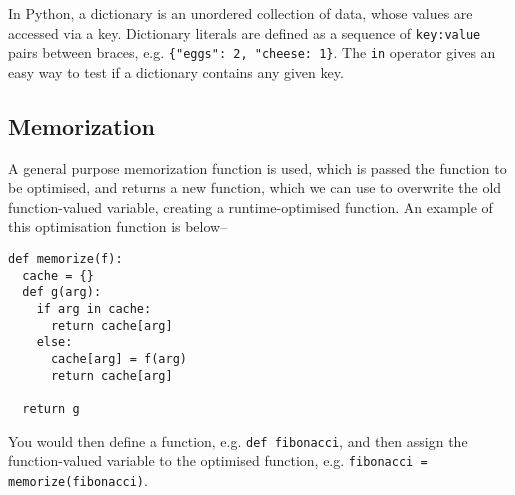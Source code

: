 In Python, a dictionary is an unordered collection of data, whose values are accessed via a key. Dictionary literals are
 defined as a sequence of \verb`key:value` pairs between braces, e.g. \verb`{"eggs": 2, "cheese: 1}`. The \verb`in`
 operator gives an easy way to test if a dictionary contains any given key.

\subsection*{Memorization}

A general purpose memorization function is used, which is passed the function to be optimised, and returns a new
 function, which we can use to overwrite the old function-valued variable, creating a runtime-optimised function. An
 example of this optimisation function is below--
\begin{verbatim}
def memorize(f):
  cache = {}
  def g(arg):
    if arg in cache:
      return cache[arg]
    else:
      cache[arg] = f(arg)
      return cache[arg]
  
  return g
\end{verbatim}
You would then define a function, e.g. \verb`def fibonacci`, and then assign the function-valued variable to the optimised
 function, e.g. \verb`fibonacci = memorize(fibonacci)`.